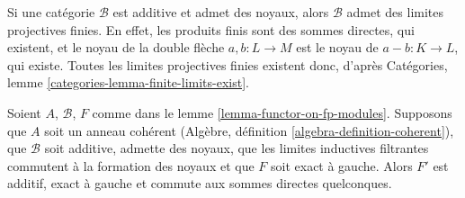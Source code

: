 \noindent
Si une catégorie $\mathcal{B}$ est additive et admet des noyaux,
alors $\mathcal{B}$ admet des limites projectives finies. En effet, les produits finis
sont des sommes directes, qui existent, et le noyau de la double flèche $a, b : L \to M$
est le noyau de $a - b : K \to L$, qui existe. Toutes les limites projectives
finies existent donc, d'après Catégories, lemme \ref{categories-lemma-finite-limits-exist}.

\begin{lemma}
\label{lemma-functor-on-fp-modules-left-exact}
Soient $A$, $\mathcal{B}$, $F$ comme dans le lemme \ref{lemma-functor-on-fp-modules}.
Supposons que $A$ soit un anneau cohérent (Algèbre, définition
\ref{algebra-definition-coherent}), que $\mathcal{B}$ soit additive, admette des noyaux,
que les limites inductives filtrantes commutent à la formation des noyaux et que $F$ soit exact à gauche. Alors
$F'$ est additif, exact à gauche et commute aux sommes directes quelconques.
\end{lemma}


